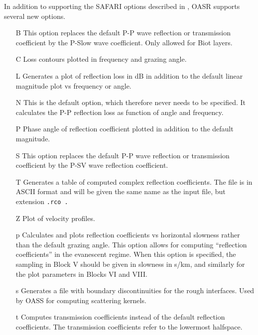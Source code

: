 In addition to supporting the SAFARI options described in \cite{hs:saf}, 
OASR supports several new options.
             \begin{itemize}
	     \item[B] This option replaces the default P-P wave
		reflection or transmission coefficient by the P-Slow wave
		coefficient. Only allowed for Biot layers.
	     \item[C] Loss contours plotted in frequency and grazing angle.
	     \item[L] Generates a plot of reflection loss in dB in addition to 
                the default linear magnitude plot  vs frequency or angle.
	     \item[N] This is the default option, which therefore
		never needs to be specified. It calculates the P-P reflection
		loss as function of angle and frequency.
	     \item[P] Phase angle of reflection coefficient plotted
		in addition to the default magnitude.
	     \item[S] This option replaces the default P-P wave
		reflection or transmission coefficient by the P-SV wave
		reflection coefficient.
	     \item[T] Generates a table of computed complex reflection 
                coefficients. The file is in ASCII format and will be 
                given the same name as the input file, but extension 
                \tt .rco \rm . 
	     \item[Z] Plot of velocity profiles.
             \item[p] Calculates and plots reflection coefficients vs
                horizontal slowness rather than the default grazing angle. 
                This option allows for computing ``reflection coefficients'' 
                in the evanescent regime. When this option is specified, the 
                sampling in Block V should be given in slowness in s/km, and 
                similarly for the plot parameters in Blocks VI and VIII.
	     \item[s] Generates a file with boundary discontinuities for the 
                rough interfaces. Used by OASS for computing scattering 
                kernels.
	     \item[t] Computes transmission coefficients instead of the 
                default reflection  coefficients. The transmission 
                coefficients refer to the lowermost halfspace.
             \end{itemize}

